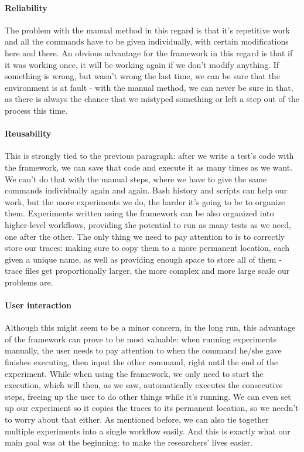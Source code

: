 \paragraph{Reliability}
The problem with the manual method in this regard is that it's
repetitive work and all the commands have to be given individually,
with certain modifications here and there. An obvious advantage for
the framework in this regard is that if it was working once, it will
be working again if we don't modify anything. If something is wrong,
but wasn't wrong the last time, we can be sure that the environment is
at fault - with the manual method, we can never be sure in that, as
there is always the chance that we mistyped something or left a step
out of the process this time.
\paragraph{Reusability}
This is strongly tied to the previous paragraph: after we write a
test's code with the framework, we can save that code and execute it
as many times as we want. We can't do that with the manual steps,
where we have to give the same commands individually again and
again. Bash history and scripts can help our work, but the more
experiments we do, the harder it's going to be to organize
them. Experiments written using the framework can be also organized
into higher-level workflows, providing the potential to run as many
tests as we need, one after the other. The only thing we need to pay
attention to is to correctly store our traces: making sure to copy
them to a more permanent location, each given a unique name, as well
as providing enough space to store all of them - trace files get
proportionally larger, the more complex and more large scale our
problems are.
\paragraph{User interaction}
Although this might seem to be a minor concern, in the long run, this
advantage of the framework can prove to be most valuable: when running
experiments manually, the user needs to pay attention to when the
command he/she gave finishes executing, then input the other command,
right until the end of the experiment. While when using the framework,
we only need to start the execution, which will then, as we saw,
automatically executes the consecutive steps, freeing up the user to
do other things while it's running. We can even set up our experiment
so it copies the traces to its permanent location, so we needn't to
worry about that either. As mentioned before, we can also tie together
multiple experiments into a single workflow easily. And this is
exactly what our main goal was at the beginning: to make the
researchers' lives easier.

